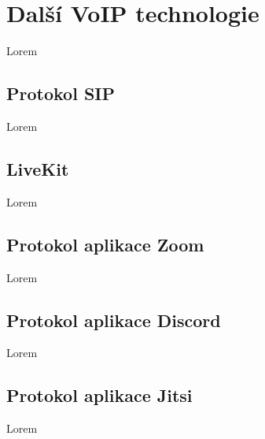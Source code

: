 \section{Další VoIP technologie}\label{voipTech}

Lorem

\subsection{Protokol SIP}

Lorem

\subsection{LiveKit}

Lorem

\subsection{Protokol aplikace Zoom}

Lorem

\subsection{Protokol aplikace Discord}

Lorem

\subsection{Protokol aplikace Jitsi}

Lorem
